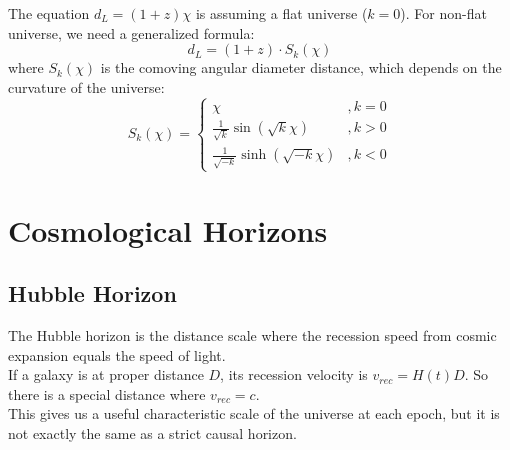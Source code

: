
\bigskip\noindent
\begin{importantnote}
    The equation $d_L=(1+z)\chi$ is assuming a flat universe ($k=0$). For non-flat universe, we need a generalized formula:
    \[
        d_L = (1+z) \cdot S_k(\chi)
    \]
    where $S_k(\chi)$ is the comoving angular diameter distance, which depends on the curvature of the universe:
    \[
        S_k(\chi) = \begin{cases}
            \chi & ,k = 0 \\
            \frac{1}{\sqrt{k}} \sin(\sqrt{k}\chi) & ,k > 0 \\
            \frac{1}{\sqrt{-k}} \sinh(\sqrt{-k}\chi) & ,k < 0
        \end{cases}
    \]
\end{importantnote}

\clearpage
\section{Cosmological Horizons}
\subsection{Hubble Horizon}

\begin{intuition}
    The Hubble horizon is the distance scale where the recession speed from cosmic expansion equals the speed of light. \\

    If a galaxy is at proper distance $D$, its recession velocity is $v_{rec}=H(t)D$. So there is a special distance where $v_{rec}=c$. \\

    This gives us a useful characteristic scale of the universe at each epoch, but it is not exactly the same as a strict causal horizon.
\end{intuition}

